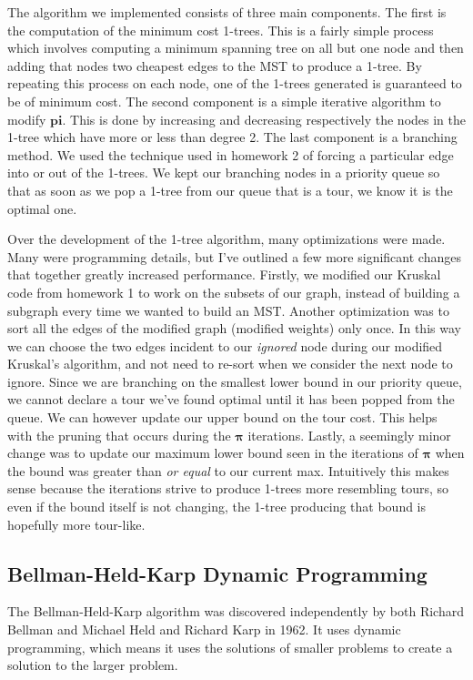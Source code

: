 \documentclass[11pt]{article}
\newcommand{\ve}[1]{\boldsymbol{#1}}
\begin{document}
	The algorithm we implemented consists of three main components. The first is the computation of the minimum cost 1-trees. This is a fairly simple process which involves computing a minimum spanning tree on all but one node and then adding that nodes two cheapest edges to the MST to produce a 1-tree. By repeating this process on each node, one of the 1-trees generated is guaranteed to be of minimum cost. The second component is a simple iterative algorithm to modify $\ve{pi}$. This is done by increasing and decreasing respectively the nodes in the 1-tree which have more or less than degree 2. The last component is a branching method. We used the technique used in homework 2 of forcing a particular edge into or out of the 1-trees. We kept our branching nodes in a priority queue so that as soon as we pop a 1-tree from our queue that is a tour, we know it is the optimal one.
	
	Over the development of the 1-tree algorithm, many optimizations were made. Many were programming details, but I've outlined a few more significant changes that together greatly increased performance. Firstly, we modified our Kruskal code from homework 1 to work on the subsets of our graph, instead of building a subgraph every time we wanted to build an MST. Another optimization was to sort all the edges of the modified graph (modified weights) only once. In this way we can choose the two edges incident to our \emph{ignored} node during our modified Kruskal's algorithm, and not need to re-sort when we consider the next node to ignore. Since we are branching on the smallest lower bound in our priority queue, we cannot declare a tour we've found optimal until it has been popped from the queue. We can however update our upper bound on the tour cost. This helps with the pruning that occurs during the $\ve{\pi}$ iterations. Lastly, a seemingly minor change was to update our maximum lower bound seen in the iterations of $\ve{\pi}$ when the bound was greater than \emph{or equal} to our current max. Intuitively this makes sense because the iterations strive to produce 1-trees more resembling tours, so even if the bound itself is not changing, the 1-tree producing that bound is hopefully more tour-like.
	
	\subsection{Bellman-Held-Karp Dynamic Programming}
	
	The Bellman-Held-Karp algorithm was discovered independently by both Richard Bellman \cite{Bellman} and Michael Held and Richard Karp \cite{HeldKarp} in 1962. It uses dynamic programming, which means it uses the solutions of smaller problems to create a solution to the larger problem.
	
\end{document}
